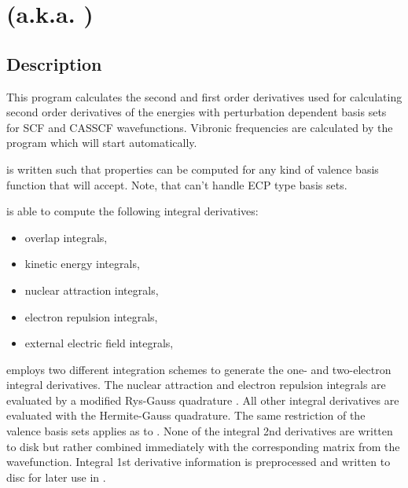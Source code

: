 
\section{ (a.k.a. )}
\label{UG:sec:mckinley}

\subsection{Description}
\label{UG:sec:mckinley_description}
This program calculates the second and first order derivatives used
for calculating second order derivatives of the energies with perturbation
dependent basis sets for SCF and CASSCF wavefunctions.
Vibronic frequencies are calculated by the  program which 
will start automatically.

 is written such that properties can be
computed for any kind of valence basis function that  will accept.
Note, that  can't handle ECP type basis sets.

 is able to compute the following integral derivatives:

\begin{itemize}
\item
overlap integrals,
\item
kinetic energy integrals,
\item
nuclear attraction integrals,
\item
electron repulsion integrals,
\item
external electric field integrals,
\end{itemize}


 employs
two different integration schemes
to generate the
one- and two-electron integral derivatives.
The nuclear attraction and electron repulsion
integrals are evaluated by a modified Rys-Gauss quadrature \cite{Bernhardsson:99a}.
All other integral
derivatives are evaluated with the Hermite-Gauss quadrature. The same
restriction of the valence basis sets applies as to .
None of the integral 2nd derivatives are written to disk but rather combined
immediately with the corresponding matrix from the wavefunction. Integral
1st derivative information is preprocessed and written to disc for later
use in .

